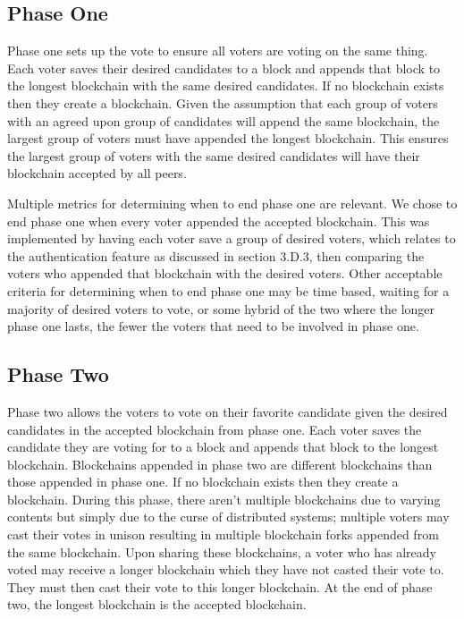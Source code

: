 \documentclass[conference]{IEEEtran}
\begin{document}
\subsection{Phase One}
Phase one sets up the vote to ensure all voters are voting on the same thing. Each voter saves their desired candidates to a block and appends that block to the longest blockchain with the same desired candidates. If no blockchain exists then they create a blockchain. Given the assumption that each group of voters with an agreed upon group of candidates will append the same blockchain, the largest group of voters must have appended the longest blockchain. This ensures the largest group of voters with the same desired candidates will have their blockchain accepted by all peers. 

Multiple metrics for determining when to end phase one are relevant. We chose to end phase one when every voter appended the accepted blockchain. This was implemented by having each voter save a group of desired voters, which relates to the authentication feature as discussed in section 3.D.3, then comparing the voters who appended that blockchain with the desired voters. Other acceptable criteria for determining when to end phase one may be time based, waiting for a majority of desired voters to vote, or some hybrid of the two where the longer phase one lasts, the fewer the voters that need to be involved in phase one. 

\subsection{Phase Two}
Phase two allows the voters to vote on their favorite candidate given the desired candidates in the accepted blockchain from phase one. Each voter saves the candidate they are voting for to a block and appends that block to the longest blockchain. Blockchains appended in phase two are different blockchains than those appended in phase one. If no blockchain exists then they create a blockchain. During this phase, there aren't multiple blockchains due to varying contents but simply due to the curse of distributed systems; multiple voters may cast their votes in unison resulting in multiple blockchain forks appended from the same blockchain. Upon sharing these blockchains, a voter who has already voted may receive a longer blockchain which they have not casted their vote to. They must then cast their vote to this longer blockchain. At the end of phase two, the longest blockchain is the accepted blockchain.
\end{document}
